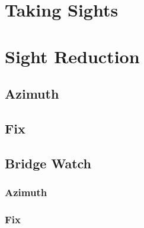 \documentclass[letterpaper,12pt]{article}
\begin{document}
\section{Taking Sights}
\section{Sight Reduction}
\subsection{Azimuth}
\subsection{Fix}
\subsection{Bridge Watch}
\subsubsection{Azimuth} \label{doubleget}
\subsubsection{Fix}
\printbibliography
\end{document}
